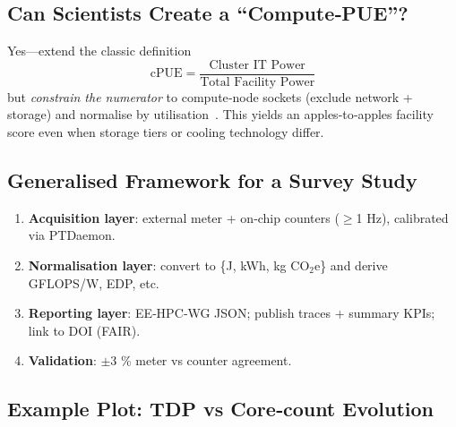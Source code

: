 \subsection{Can Scientists Create a ``Compute‑PUE''?}

Yes—extend the classic definition
\[
\text{cPUE}=\frac{\text{Cluster IT Power}}
                  {\text{Total Facility Power}}
\]
but \emph{constrain the numerator} to compute‑node sockets (exclude
network + storage) and normalise by utilisation~\cite{laszewski2010}.
This yields an apples‑to‑apples facility score even when storage tiers
or cooling technology differ.

\subsection{Generalised Framework for a Survey Study}


\begin{enumerate}
  \item \textbf{Acquisition layer}: external meter + on‑chip counters
        ($\ge$1 Hz), calibrated via PTDaemon.
  \item \textbf{Normalisation layer}: convert to \{J, kWh, kg CO$_2$e\}
        and derive GFLOPS/W, EDP, etc.
  \item \textbf{Reporting layer}: EE‑HPC‑WG JSON; publish traces +
        summary KPIs; link to DOI (FAIR).
  \item \textbf{Validation}: $\pm$3 \% meter vs counter agreement.
\end{enumerate}

\subsection{Example Plot: TDP vs Core‑count Evolution}


